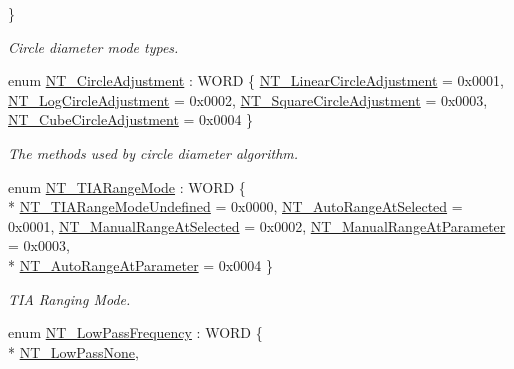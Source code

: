 \begin{DoxyCompactItemize}
 \}\begin{DoxyCompactList}\small\item\em Circle diameter mode types. \end{DoxyCompactList}
\item 
enum \hyperlink{group___common_ga3283dfae2d4aebfb73f1d3db07a36860}{N\+T\+\_\+\+Circle\+Adjustment} \+: W\+O\+RD \{ \hyperlink{group___common_gga3283dfae2d4aebfb73f1d3db07a36860a47d85db4e4120438c7cd81eb14cd4725}{N\+T\+\_\+\+Linear\+Circle\+Adjustment} = 0x0001, 
\hyperlink{group___common_gga3283dfae2d4aebfb73f1d3db07a36860a095a9db4216985f0e9d48779d59823a6}{N\+T\+\_\+\+Log\+Circle\+Adjustment} = 0x0002, 
\hyperlink{group___common_gga3283dfae2d4aebfb73f1d3db07a36860a084474c313682bfaf25df06ee1a74e03}{N\+T\+\_\+\+Square\+Circle\+Adjustment} = 0x0003, 
\hyperlink{group___common_gga3283dfae2d4aebfb73f1d3db07a36860a5f12a586dcb599d1f28e45c32af369bc}{N\+T\+\_\+\+Cube\+Circle\+Adjustment} = 0x0004
 \}\begin{DoxyCompactList}\small\item\em The methods used by circle diameter algorithm. \end{DoxyCompactList}
\item 
enum \hyperlink{group___common_ga17a2e7154218bc950c0568a08a1307a8}{N\+T\+\_\+\+T\+I\+A\+Range\+Mode} \+: W\+O\+RD \{ \\*
\hyperlink{group___common_gga17a2e7154218bc950c0568a08a1307a8ac64176595d7e50c64b6eaed623b58520}{N\+T\+\_\+\+T\+I\+A\+Range\+Mode\+Undefined} = 0x0000, 
\hyperlink{group___common_gga17a2e7154218bc950c0568a08a1307a8a63c9b4ebac2f6d73727a45971311e52e}{N\+T\+\_\+\+Auto\+Range\+At\+Selected} = 0x0001, 
\hyperlink{group___common_gga17a2e7154218bc950c0568a08a1307a8a252d48984351987360bdf4ae2a1ca8c3}{N\+T\+\_\+\+Manual\+Range\+At\+Selected} = 0x0002, 
\hyperlink{group___common_gga17a2e7154218bc950c0568a08a1307a8aed6c60d4f4e26f42cb2952f8ced2f813}{N\+T\+\_\+\+Manual\+Range\+At\+Parameter} = 0x0003, 
\\*
\hyperlink{group___common_gga17a2e7154218bc950c0568a08a1307a8a0c17f2f4a225154c75ba3db009a472f3}{N\+T\+\_\+\+Auto\+Range\+At\+Parameter} = 0x0004
 \}\begin{DoxyCompactList}\small\item\em T\+IA Ranging Mode. \end{DoxyCompactList}
\item 
enum \hyperlink{group___common_ga5dcfcfcc977bb4f76ff0b66742371f2a}{N\+T\+\_\+\+Low\+Pass\+Frequency} \+: W\+O\+RD \{ \\*
\hyperlink{group___common_gga5dcfcfcc977bb4f76ff0b66742371f2aa1a9e53411f076a811db1ddc85b5998ab}{N\+T\+\_\+\+Low\+Pass\+None}, 

\end{DoxyCompactItemize}
